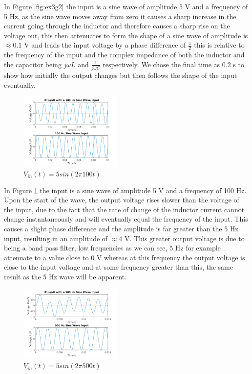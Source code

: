 \documentclass[11pt,a4paper]{article}
\begin{document}
In Figure \ref{fig:ex3g2} the input is a sine wave of amplitude 5 V and a frequency of 5 Hz, as the sine wave moves away from zero it causes a sharp increase in the current going through the inductor and therefore causes a sharp rise on the voltage out, this then attenuates to form the shape of a sine wave of amplitude is $\approx 0.1$ V and leads the input voltage by a phase difference of $\frac{\pi}{2}$ this is relative to the frequency of the input and the complex impedance of both the inductor and the capacitor being $j\omega L$ and $\frac{1}{j\omega C}$ respectively. We chose the final time as 0.2 s to show how initially the output changes but then follows the shape of the input eventually.

\begin{figure}
    \vspace{-15mm}
  		\includegraphics[width=0.45\textwidth]{Ex3_Figs/100Sine.png}
	\vspace{-3mm}
  	\caption{$V_{in}(t)= 5sin(2 \pi 100t)$}
  	\label{fig:ex3g3}
\end{figure}

\vspace{6mm}In Figure \ref{fig:ex3g3} the input is a sine wave of amplitude 5 V and a frequency of 100 Hz. Upon the start of the wave, the output voltage rises slower than the voltage of the input, due to the fact that the rate of change of the inductor current cannot change instantaneously and will eventually equal the frequency of the input. This causes a slight phase difference and the amplitude is far greater than the 5 Hz input, resulting in an amplitude of $\approx 4$ V. This greater output voltage is due to being a band pass filter, low frequencies as we can see, 5 Hz for example attenuate to a value close to 0 V whereas at this frequency the output voltage is close to the input voltage and at some frequency greater than this, the same result as the 5 Hz wave will be apparent.

\begin{figure}
    \vspace{-33mm}
  		\includegraphics[width=0.45\textwidth]{Ex3_Figs/500Sine.png}
	\vspace{-3mm}
  	\caption{$V_{in}(t)= 5sin(2 \pi 500t)$}
  	\label{fig:ex3g4}
\end{figure}
\end{document}
